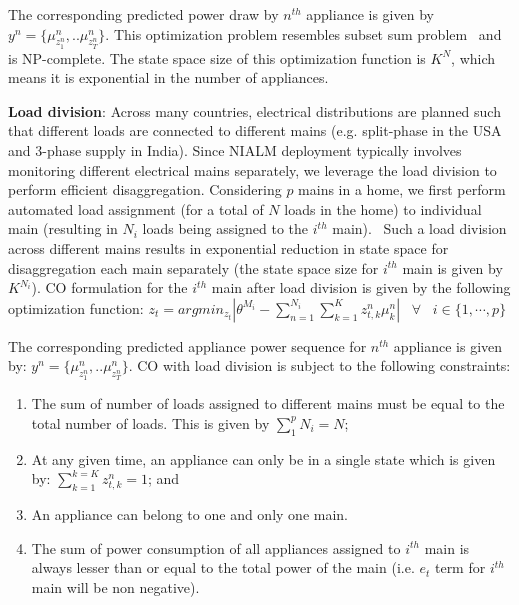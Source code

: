 \documentclass[conference]{IEEEtran}
\newcommand{\denselistbib}{
  \itemsep -.6pt\topsep-4pt\partopsep-4pt
}
\begin{document}
\noindent The corresponding predicted power draw by $n^{th}$ appliance is given by $y^n=\{\mu_{z_1^n}^n,..\mu_{z_T^n}^n \}$. This optimization problem resembles subset sum problem~\cite{knapsack} and is NP-complete. The state space size of this optimization function is $K^N$, which means it is exponential in the number of appliances. 


\noindent \textbf{Load division}: Across many countries, electrical distributions are planned such that different loads are connected to different mains (e.g. split-phase in the USA and 3-phase supply in India). Since NIALM deployment typically involves monitoring different electrical mains separately, we leverage the load division to perform efficient disaggregation. Considering $p$ mains in a home, we first perform automated load assignment (for a total of $N$ loads in the home) to individual main (resulting in $N_i$ loads being assigned to the $i^{th}$ main).%
~Such a load division across different mains results in exponential reduction in state space for disaggregation each main separately (the state space size for $i^{th}$ main is given by $K^{N_i}$). %
CO formulation for the $i^{th}$ main after load division is given by the following optimization function: 
\vspace{-2mm}
$z_t=arg min_{z_t}|\theta^{M_i}-\sum\limits_{n=1}^{N_i}\sum\limits_{k=1}^{K}z_{t,k}^n\mu_k^n| \;\;\; \forall \;\;\; i\in \{1,\cdots,p\}$

\noindent The corresponding predicted appliance power sequence for $n^{th}$ appliance is given by: $y^n=\{\mu_{z_1^n}^n,..\mu_{z_T^n}^n \}$. CO with load division is subject to the following constraints:
\vspace{-2mm}
\begin{enumerate}\denselistbib
\item The sum of number of loads assigned to different mains must be equal to the total number of loads. This is given by $\sum\limits_{1}^{p}{N_i}=N$; 
\item At any given time, an appliance can only be in a single state which is given by: $\sum\limits_{k=1}^{k=K} z_{t,k}^n=1$; and 
\item An appliance can belong to one and only one main. 
\item The sum of power consumption of all appliances assigned to $i^{th}$ main is always lesser than or equal to the total power of the main (i.e. $e_t$ term for $i^{th}$ main will be non negative).
\end{enumerate}
\end{document}
